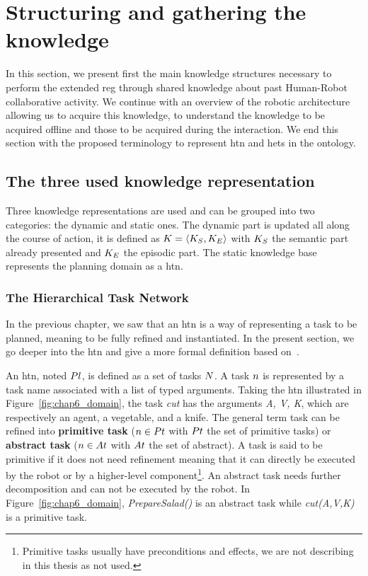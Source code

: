 \section{Structuring and gathering the knowledge}

In this section, we present first the main knowledge structures necessary to perform the extended \acrshort{reg} through shared knowledge about past Human-Robot collaborative activity. We continue with an overview of the robotic architecture allowing us to acquire this knowledge, to understand the knowledge to be acquired offline and those to be acquired during the interaction. We end this section with the proposed terminology to represent \acrshort{htn} and \acrshort{het}s in the ontology.

\subsection{The three used knowledge representation}

Three knowledge representations are used and can be grouped into two categories: the dynamic and static ones. The dynamic part is updated all along the course of action, it is defined as $K = \langle K_S, K_E \rangle$ with $K_S$ the semantic part already presented and $K_E$ the episodic part. The static knowledge base represents the planning domain as a \acrfull{htn}.

\subsubsection{The Hierarchical Task Network}

In the previous chapter, we saw that an \acrshort{htn} is a way of representing a task to be planned, meaning to be fully refined and instantiated. In the present section, we go deeper into the \acrshort{htn} and give a more formal definition based on~\cite{erol_1994_htn}.

An \acrshort{htn}, noted $Pl$, is defined as a set of tasks $N$. A task $n$ is represented by a task name associated with a list of typed arguments. Taking the \acrshort{htn} illustrated in Figure~\ref{fig:chap6_domain}, the task \textit{cut} has the arguments \textit{A, V, K}, which are respectively an agent, a vegetable, and a knife. The general term task can be refined into \textbf{primitive task} ($n \in Pt$ with $Pt$ the set of primitive tasks) or \textbf{abstract task} ($n \in At$ with $At$ the set of abstract). A task is said to be primitive if it does not need refinement meaning that it can directly be executed by the robot or by a higher-level component\footnote{Primitive tasks usually have preconditions and effects, we are not describing in this thesis as not used.}. An abstract task needs further decomposition and can not be executed by the robot. In Figure~\ref{fig:chap6_domain}, \textit{PrepareSalad()} is an abstract task while \textit{cut(A,V,K)} is a primitive task.

